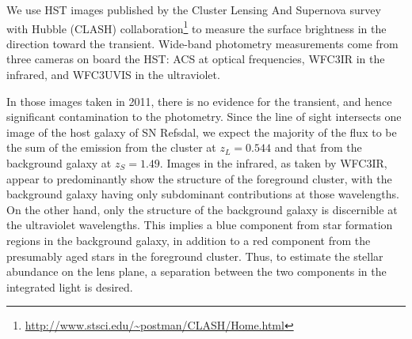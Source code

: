\documentclass{aastex6}
\begin{document}
We use HST images published by the Cluster Lensing And Supernova survey with Hubble (CLASH) collaboration\footnote{\url{http://www.stsci.edu/~postman/CLASH/Home.html}} to measure the surface brightness in the direction toward the transient. Wide-band photometry measurements come from three cameras on board the HST: ACS at optical frequencies, WFC3IR in the infrared, and WFC3UVIS in the ultraviolet. 

In those images taken in 2011, there is no evidence for the transient, and hence significant contamination to the photometry. Since the line of sight intersects one image of the host galaxy of SN Refsdal, we expect the majority of the flux to be the sum of the emission from the cluster at $z_L=0.544$ and that from the background galaxy at $z_S=1.49$. Images in the infrared, as taken by WFC3IR, appear to predominantly show the structure of the foreground cluster, with the background galaxy having only subdominant contributions at those wavelengths. On the other hand, only the structure of the background galaxy is discernible at the ultraviolet wavelengths. This implies a blue component from star formation regions in the background galaxy, in addition to a red component from the presumably aged stars in the foreground cluster. Thus, to estimate the stellar abundance on the lens plane, a separation between the two components in the integrated light is desired.
\end{document}
